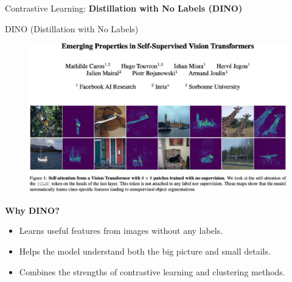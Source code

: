 \begin{frame}{}
    \LARGE Contrastive Learning: \textbf{Distillation with No Labels (DINO)}
\end{frame}


\begin{frame}[allowframebreaks]{DINO (Distillation with No Labels)}
\begin{figure}
    \centering
    \includegraphics[width=\linewidth,height=0.9\textheight,keepaspectratio]{images/contrastive/slide_86_1_img.jpg}
\end{figure}

\framebreak

\textbf{Why DINO?}
\begin{itemize}
    \item Learns useful features from images without any labels.
    \item Helps the model understand both the big picture and small details.
    \item Combines the strengths of contrastive learning and clustering methods.
\end{itemize}

\framebreak


\end{frame}
